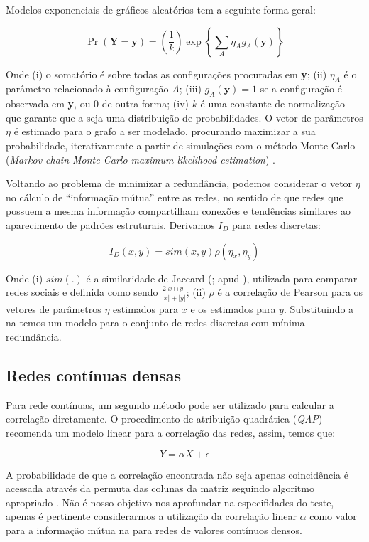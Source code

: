 Modelos exponenciais de gráficos aleatórios tem a seguinte forma geral:

\begin{equation}
\label{def:p_star_geral}
\Pr(\textbf{Y} = \textbf{y})
=\left(\frac{1}{k}\right)\exp\left\{\sum_A\eta_Ag_A(\textbf{y})\right\}
\end{equation}

Onde (i) o somatório é sobre todas as configurações procuradas em \textbf{y};
(ii) $\eta_A$ é o parâmetro relacionado à configuração $A$; (iii)
$g_A(\textbf{y})=1$ se a configuração é observada em \textbf{y}, ou 0 de outra
forma; (iv) $k$ é uma constante de normalização que garante que
a  seja uma distribuição de probabilidades. O vetor de
parâmetros $\eta$ é estimado para o grafo a ser modelado, procurando maximizar
a sua probabilidade, iterativamente a partir de simulações com o método Monte
Carlo (\emph{Markov chain Monte Carlo maximum likelihood estimation})
\citep{ROBINS2007b, Snijders2006}.

Voltando ao problema de minimizar a redundância, podemos considerar o vetor
$\eta$ no cálculo de ``informação mútua'' entre as redes, no sentido de que redes
que possuem a mesma informação compartilham conexões e tendências similares ao
aparecimento de padrões estruturais. Derivamos $I_D$ para redes discretas:

\begin{equation}
\label{def:MI_discreto}
I_D(x, y) = sim(x,y) \rho(\eta_x, \eta_y)
\end{equation}

Onde (i) $sim(.)$ é a similaridade de Jaccard (\citealt{Jaccard1912}; apud
\citealt{Berger-Wolf2006}), utilizada para comparar redes sociais e definida como
sendo $\frac{2|x\cap y|}{|x| + |y|}$; (ii) $\rho$ é a correlação de Pearson para
os vetores de parâmetros $\eta$ estimados para $x$ e os estimados para $y$.
Substituindo a  na  temos um
modelo para o conjunto de redes discretas com mínima redundância.

\subsection{Redes contínuas densas}

Para rede contínuas, um segundo método pode ser utilizado para calcular a
correlação diretamente. O procedimento de atribuição quadrática (\textit{QAP})
recomenda um modelo linear para a correlação das redes, assim, temos que:

\begin{equation}
\label{def:linear_model_qap}
Y = \alpha X + \epsilon
\end{equation}

A probabilidade de que a correlação encontrada não seja apenas coincidência é
acessada através da permuta das colunas da matriz seguindo algoritmo apropriado
\citep{Anderson2001, Dekker2007}. Não é nosso objetivo nos aprofundar na
especifidades do teste, apenas é pertinente considerarmos a  utilização da
correlação linear $\alpha$ como valor para a informação mútua na
 para redes de valores contínuos densos.
